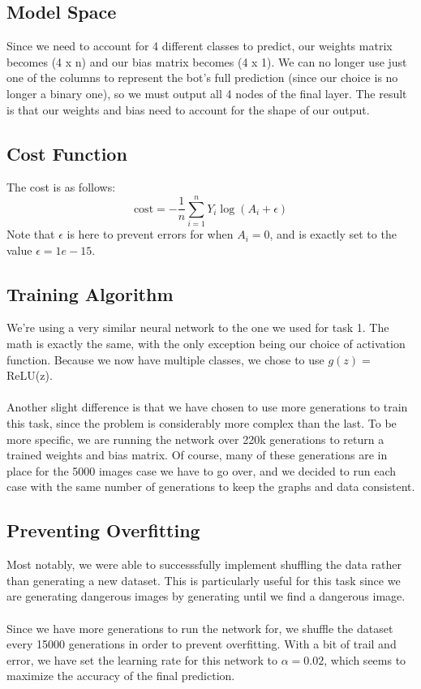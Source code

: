 \documentclass[12pt]{article}
\begin{document}
\subsection*{Model Space}
Since we need to account for 4 different classes to predict, our weights matrix becomes 
(4 x n) and our bias matrix becomes (4 x 1). We can no longer use just one of the columns to represent the bot's full 
prediction (since our choice is no longer a binary one), so we must output all 4 nodes of the final layer. The result is that 
our weights and bias need to account for the shape of our output. 

\subsection*{Cost Function}
The cost is as follows: 
\[
    \text{cost} = -\frac{1}{n} \sum_{i=1}^{n} Y_i \log(A_i + \epsilon)
\] 
Note that $\epsilon$ is here to prevent errors for when $A_i = 0$, and is exactly set to the value $\epsilon = 1e-15$.  

\subsection*{Training Algorithm}
We're using a very similar neural network to the one we used for task 1. The math is exactly the same, with the only exception being 
our choice of activation function. Because we now have multiple classes, we chose to use $g(z) = $ReLU(z). 
\\
\\
Another slight difference is that we have chosen to use more generations to train this task, since the problem is considerably more 
complex than the last. To be more specific, we are running the network over 220k generations to return a trained weights 
and bias matrix. Of course, many of these generations are in place for the 5000 images case we have to go over, and we decided 
to run each case with the same number of generations to keep the graphs and data consistent.

\subsection*{Preventing Overfitting}
Most notably, we were able to successsfully implement shuffling the data rather than generating a new dataset. This is 
particularly useful for this task since we are generating dangerous images by generating until we find a dangerous image. 
\\ \\
Since we have more generations to run the network for, we shuffle the dataset every 15000 generations in order to prevent overfitting. With a
bit of trail and error, we have set the learning rate for this network to $\alpha = 0.02$, which seems to maximize the accuracy of 
the final prediction. 
\end{document}
